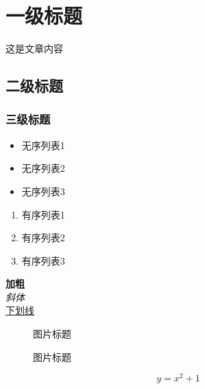 \documentclass[12pt, a4paper, oneside]{ctexart}
\begin{document}
\tableofcontents %
\newcommand{\upcite}[1]{\textsuperscript{\cite{#1}}} %
\newpage %

\section{一级标题}
\hspace{2.65mm} %
这是文章内容
\vspace{2mm} %

\subsection{二级标题}

\subsubsection{三级标题}




\begin{itemize}
    \item 无序列表1
    \item 无序列表2
    \item 无序列表3
\end{itemize}


\begin{enumerate}
    \item 有序列表1
    \item 有序列表2
    \item 有序列表3
\end{enumerate}


\textbf{加粗} \\
\textit{斜体} \\
\underline{下划线} \\



\begin{figure}[H]
\centering 
\caption{图片标题}
\end{figure}

\begin{figure}[H]

\centering
\caption{图片标题}
\end{figure}


\begin{equation}
y=x^{2}+1
\end{equation}
\end{document}
